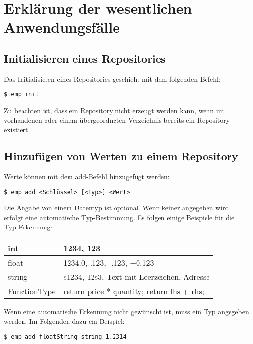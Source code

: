 

\section{Erklärung der wesentlichen Anwendungsfälle}

\subsection{Initialisieren eines Repositories}
Das Initialisieren eines Repositories geschieht mit dem folgenden Befehl:
\begin{lstlisting}[style=Bash]
$ emp init
\end{lstlisting}
Zu beachten ist, dass ein Repository nicht erzeugt werden kann, wenn im vorhandenen oder einem übergeordneten Verzeichnis bereits ein Repository existiert.

\subsection{Hinzufügen von Werten zu einem Repository}
Werte können mit dem add-Befehl hinzugefügt werden:
\begin{lstlisting}[style=Bash]
$ emp add <Schlüssel> [<Typ>] <Wert>
\end{lstlisting}
Die Angabe von einem Datentyp ist optional. Wenn keiner angegeben wird, erfolgt eine automatische Typ-Bestimmung.
Es folgen einige Beispiele für die Typ-Erkennung:

\begin{tabular}{| l | l |}
	\hline
	int & 1234, 123 \\
	\hline
	float & 1234.0, .123, -.123, +0.123 \\
	\hline
	string & s1234, 12s3, \grqq Text mit Leerzeichen\grqq , Adresse \\
	\hline
	FunctionType & \grqq return price * quantity; return lhs + rhs; \grqq\\
	\hline
\end{tabular}

Wenn eine automatische Erkennung nicht gewünscht ist, muss ein Typ angegeben werden. Im Folgenden dazu ein Beispiel:
\begin{lstlisting}[style=Bash]
$ emp add floatString string 1.2314
\end{lstlisting}

